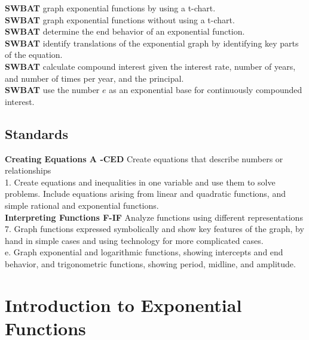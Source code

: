 \documentclass[12pt]{article}
\begin{document}
\textbf{SWBAT} graph exponential functions by using a t-chart.\\

\textbf{SWBAT} graph exponential functions without using a t-chart.\\

\textbf{SWBAT} determine the end behavior of an exponential function.\\

\textbf{SWBAT} identify translations of the exponential graph by identifying key parts of the equation.\\

\textbf{SWBAT} calculate compound interest given the interest rate, number of years, and number of times per year, and the principal.\\

\textbf{SWBAT} use the number $e$ as an exponential base for continuously compounded interest.\\



\subsection*{Standards}

\textbf{Creating Equations A -CED} Create equations that describe numbers or relationships\\

1. Create equations and inequalities in one variable and use them to solve problems. Include equations arising from linear and quadratic functions, and simple rational and exponential functions.\\

\textbf{Interpreting Functions F-IF} Analyze functions using different representations \\

7. Graph functions expressed symbolically and show key features of the graph, by hand in simple cases and using technology for more complicated cases.\\

e. Graph exponential and logarithmic functions, showing intercepts and end behavior, and trigonometric functions, showing period, midline, and amplitude.\\



\pagebreak

\section*{Introduction to Exponential Functions}
\end{document}
